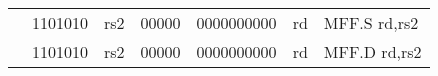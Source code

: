 \begin{table}[p]
\begin{small}
\begin{center}
\begin{tabular}{rcccccccccccl}
&
\multicolumn{2}{|c|}{1101010} &
\multicolumn{1}{c|}{rs2} &
\multicolumn{1}{c|}{00000} &
\multicolumn{6}{c|}{0000000000} &
\multicolumn{1}{c|}{rd} & MFF.S rd,rs2 \\
\cline{2-12}
  

&
\multicolumn{2}{|c|}{1101010} &
\multicolumn{1}{c|}{rs2} &
\multicolumn{1}{c|}{00000} &
\multicolumn{6}{c|}{0000000000} &
\multicolumn{1}{c|}{rd} & MFF.D rd,rs2 \\
\cline{2-12}
  

\end{tabular}
\end{center}
\end{small}

\label{instr-table}
\end{table}
  

\newpage

